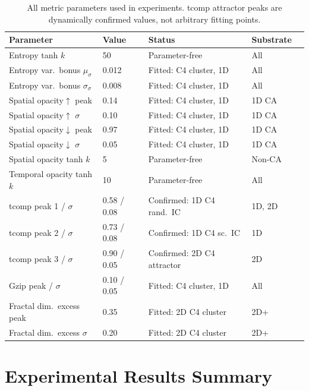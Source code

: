 \documentclass[12pt,a4paper]{article}
\begin{document}
\begin{table}[h]
\centering
\caption{All metric parameters used in experiments.
  tcomp attractor peaks are dynamically confirmed values,
  not arbitrary fitting points.}
\begin{tabular}{lllll}
\toprule
Parameter & Value & Status & Substrate \\
\midrule
Entropy tanh $k$ & 50 & Parameter-free & All \\
Entropy var.\ bonus $\mu_\sigma$ & 0.012 & Fitted: C4 cluster, 1D & All \\
Entropy var.\ bonus $\sigma_\sigma$ & 0.008 & Fitted: C4 cluster, 1D & All \\
Spatial opacity$\uparrow$ peak & 0.14 & Fitted: C4 cluster, 1D & 1D CA \\
Spatial opacity$\uparrow$ $\sigma$ & 0.10 & Fitted: C4 cluster, 1D & 1D CA \\
Spatial opacity$\downarrow$ peak & 0.97 & Fitted: C4 cluster, 1D & 1D CA \\
Spatial opacity$\downarrow$ $\sigma$ & 0.05 & Fitted: C4 cluster, 1D & 1D CA \\
Spatial opacity tanh $k$ & 5 & Parameter-free & Non-CA \\
Temporal opacity tanh $k$ & 10 & Parameter-free & All \\
tcomp peak 1 / $\sigma$ & 0.58 / 0.08 & Confirmed: 1D C4 rand.\ IC & 1D, 2D \\
tcomp peak 2 / $\sigma$ & 0.73 / 0.08 & Confirmed: 1D C4 sc.\ IC & 1D \\
tcomp peak 3 / $\sigma$ & 0.90 / 0.05 & Confirmed: 2D C4 attractor & 2D \\
Gzip peak / $\sigma$ & 0.10 / 0.05 & Fitted: C4 cluster, 1D & All \\
Fractal dim.\ excess peak & 0.35 & Fitted: 2D C4 cluster & 2D+ \\
Fractal dim.\ excess $\sigma$ & 0.20 & Fitted: 2D C4 cluster & 2D+ \\
\bottomrule
\end{tabular}
\end{table}

\section{Experimental Results Summary}
\end{document}
